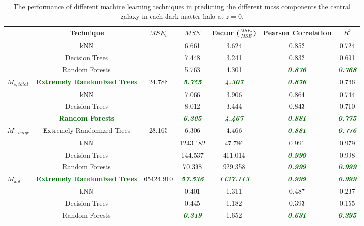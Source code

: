 \documentclass[a4paper,fleqn,usenatbib]{mnras}
\begin{document}
\begin{table}
\begin{minipage}{159mm}
 \caption{The performance of different machine learning techniques in predicting the different mass components the central galaxy in each dark matter halo at $z=0$.}
 \label{mse}
 \begin{tabular}{@{}lcccccc}
  \hline
  \hline
   & Technique & $MSE_b$ & $MSE$ & Factor ($\frac{MSE_b}{MSE}$) & Pearson Correlation
         & $R^2$\\
  \hline
  & kNN & & 6.661 & 3.624 & 0.852 & 0.724 \\
  & Decision Trees &  & 7.448 & 3.241 & 0.832 & 0.691\\
  & Random Forests &  & 5.763 & 4.301 & \textcolor{darkgreen}{\textbf{\textit{0.876}}} & \textcolor{darkgreen}{\textbf{\textit{0.768}}}\\
  \multirow{-5}{*}{$M_{\star,total}$} & \textcolor{darkgreen}{\textbf{Extremely Randomized Trees}} & \multirow{-5}{*}{24.788} & \textcolor{darkgreen}{\textit{\textbf{5.755}}} & \textcolor{darkgreen}{\textbf{\textit{4.307}}} & \textcolor{darkgreen}{\textbf{\textit{0.876}}} & 0.766\\
  
  \hline
  & kNN & & 7.066 & 3.906 & 0.864 & 0.744 \\
  & Decision Trees &  & 8.012 & 3.444 & 0.843 & 0.710 \\
  & \textcolor{darkgreen}{\textbf{Random Forests}} &  & \textcolor{darkgreen}{\textbf{\textit{6.305}}} & \textcolor{darkgreen}{\textbf{\textit{4.467}}} & \textcolor{darkgreen}{\textbf{\textit{0.881}}} & \textcolor{darkgreen}{\textbf{\textit{0.775}}} \\
  \multirow{-5}{*}{$M_{\star,bulge}$} & Extremely Randomized Trees & \multirow{-5}{*}{28.165} & 6.306 & 4.466 & \textcolor{darkgreen}{\textbf{\textit{0.881}}} & \textcolor{darkgreen}{\textbf{\textit{0.776}}}\\
  \hline
  & kNN & & 1243.182 & 47.786 & 0.991 & 0.979\\
  & Decision Trees &  & 144.537 & 411.014 & \textcolor{darkgreen}{\textbf{\textit{0.999}}} & 0.998\\
  & Random Forests &  & 70.398 & 929.358 & \textcolor{darkgreen}{\textbf{\textit{0.999}}} & \textcolor{darkgreen}{\textbf{\textit{0.999}}} \\
  \multirow{-5}{*}{$M_{hot}$} & \textcolor{darkgreen}{\textbf{Extremely Randomized Trees}} & \multirow{-5}{*}{65424.910} & \textcolor{darkgreen}{\textbf{\textit{57.536}}} & \textcolor{darkgreen}{\textbf{\textit{1137.113}}} & \textcolor{darkgreen}{\textbf{\textit{0.999}}} & \textcolor{darkgreen}{\textbf{\textit{0.999}}}\\
 \hline
  & kNN & & 0.401 & 1.311 & 0.487 & 0.237\\
  & Decision Trees &  & 0.445 & 1.182 & 0.393 & 0.155\\
  & Random Forests &  & \textcolor{darkgreen}{\textbf{\textit{0.319}}} & 1.652 & \textcolor{darkgreen}{\textbf{\textit{0.631}}} & \textcolor{darkgreen}{\textbf{\textit{0.395}}} \\
  

\end{tabular}
\end{minipage}
\end{table}
\end{document}
